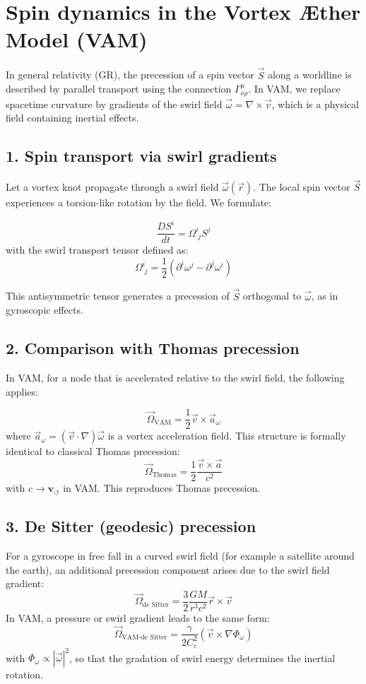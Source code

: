 \section{Spin dynamics in the Vortex Æther Model (VAM)}

In general relativity (GR), the precession of a spin vector \( \vec{S} \) along a worldline is described by parallel transport using the connection \( \Gamma^\mu_{\nu\rho} \). In VAM, we replace spacetime curvature by gradients of the swirl field \( \vec{\omega} = \nabla \times \vec{v} \), which is a physical field containing inertial effects.

\subsection*{1. Spin transport via swirl gradients}
Let a vortex knot propagate through a swirl field \( \vec{\omega}(\vec{r}) \). The local spin vector \( \vec{S} \) experiences a torsion-like rotation by the field. We formulate:

\[
\frac{D S^i}{dt} = \Omega^i_{\;j} S^j
\]
with the swirl transport tensor defined as:
\[
\Omega^i_{\;j} = \frac{1}{2} \left( \partial^i \omega^j - \partial^j \omega^i \right)
\]

\noindent This antisymmetric tensor generates a precession of \( \vec{S} \) orthogonal to \( \vec{\omega} \), as in gyroscopic effects.

\subsection*{2. Comparison with Thomas precession}
In VAM, for a node that is accelerated relative to the swirl field, the following applies:

\[
\vec{\Omega}_\text{VAM} = \frac{1}{2} \vec{v} \times \vec{a}_{\omega}
\]
where \( \vec{a}_{\omega} = (\vec{v} \cdot \nabla) \vec{\omega} \) is a vortex acceleration field. This structure is formally identical to classical Thomas precession:
\[
\vec{\Omega}_\text{Thomas} = \frac{1}{2} \frac{\vec{v} \times \vec{a}}{c^2}
\]
with \( c \rightarrow \mathbf{v}_{\scriptscriptstyle\boldsymbol{\circlearrowleft}} \) in VAM. This reproduces Thomas precession.

\subsection*{3. De Sitter (geodesic) precession}
For a gyroscope in free fall in a curved swirl field (for example a satellite around the earth), an additional precession component arises due to the swirl field gradient:
\[
\vec{\Omega}_\text{de Sitter} = \frac{3}{2} \frac{GM}{r^3 c^2} \vec{r} \times \vec{v}
\]
In VAM, a pressure or swirl gradient leads to the same form:
\[
\vec{\Omega}_\text{VAM-de Sitter} = \frac{\gamma}{2 C_e^2} (\vec{v} \times \nabla \Phi_\omega)
\]
with \( \Phi_\omega \propto |\vec{\omega}|^2 \), so that the gradation of swirl energy determines the inertial rotation.

